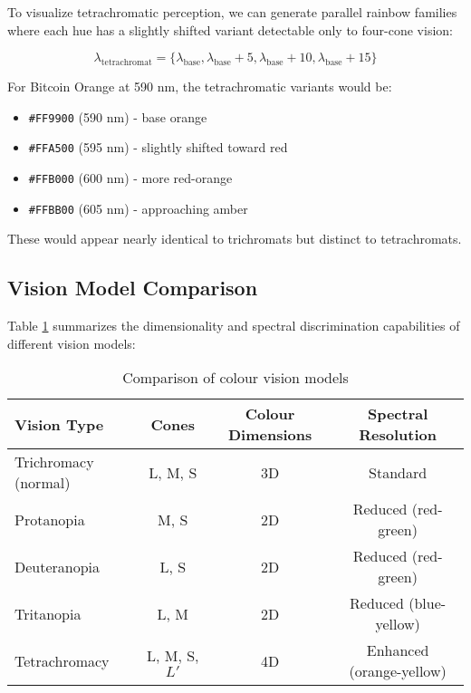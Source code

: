 \documentclass[12pt,a4paper]{article}
\newcommand{\wavelength}{\lambda}
\begin{document}
To visualize tetrachromatic perception, we can generate parallel rainbow families where each hue has a slightly shifted variant detectable only to four-cone vision:

\begin{equation}
\wavelength_{\text{tetrachromat}} = \{\wavelength_{\text{base}}, \wavelength_{\text{base}} + 5, \wavelength_{\text{base}} + 10, \wavelength_{\text{base}} + 15\}
\end{equation}

For Bitcoin Orange at 590 nm, the tetrachromatic variants would be:
\begin{itemize}
\item \texttt{\#FF9900} (590 nm) - base orange
\item \texttt{\#FFA500} (595 nm) - slightly shifted toward red
\item \texttt{\#FFB000} (600 nm) - more red-orange
\item \texttt{\#FFBB00} (605 nm) - approaching amber
\end{itemize}

These would appear nearly identical to trichromats but distinct to tetrachromats.

\subsection{Vision Model Comparison}

Table \ref{tab:vision-models} summarizes the dimensionality and spectral discrimination capabilities of different vision models:

\begin{table}[ht]
\centering
\caption{Comparison of colour vision models}
\label{tab:vision-models}
\begin{tabular}{lccc}
\toprule
\textbf{Vision Type} & \textbf{Cones} & \textbf{Colour Dimensions} & \textbf{Spectral Resolution} \\
\midrule
Trichromacy (normal) & L, M, S & 3D & Standard \\
Protanopia & M, S & 2D & Reduced (red-green) \\
Deuteranopia & L, S & 2D & Reduced (red-green) \\
Tritanopia & L, M & 2D & Reduced (blue-yellow) \\
Tetrachromacy & L, M, S, $L'$ & 4D & Enhanced (orange-yellow) \\
\bottomrule
\end{tabular}
\end{table}
\end{document}
